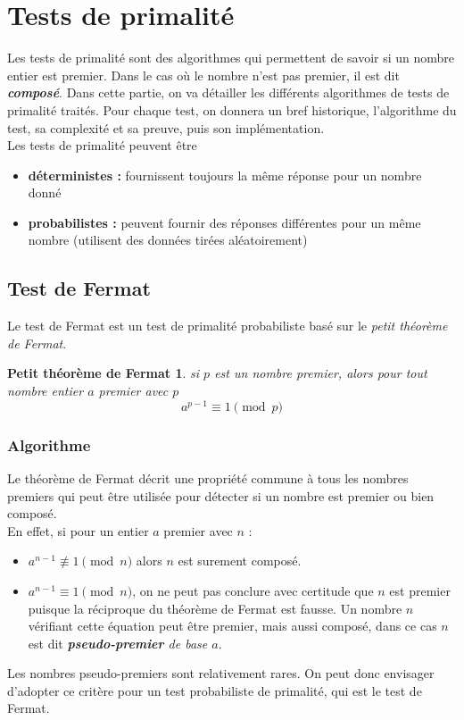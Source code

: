 	\section{Tests de primalité}
		Les tests de primalité sont des algorithmes qui permettent de savoir si un nombre entier est premier. Dans le cas où le nombre n'est pas premier, il est dit \textbf{\textit{composé}}. Dans cette partie, on va détailler les différents algorithmes de tests de primalité traités. Pour chaque test, on donnera un bref historique, l'algorithme du test, sa complexité et sa preuve, puis son implémentation.\\
		Les tests de primalité peuvent être
		\begin{itemize}[leftmargin=*]
			\item \textbf{déterministes :} fournissent toujours la même réponse pour un nombre donné
			\item \textbf{probabilistes :} peuvent fournir des réponses différentes pour un même nombre (utilisent des données tirées aléatoirement)
		\end{itemize}
		
		\subsection{Test de Fermat}
			Le test de Fermat est un test de primalité probabiliste basé sur le \textit{petit théorème de Fermat}.
			\newtheorem*{Fermat}{Petit théorème de Fermat}
			\vspace{-1.5em}\begin{adjustwidth}{1.5cm}{1.5cm} 
			\begin{Fermat}
				si $p$ est un nombre premier, alors pour tout nombre entier $a$ premier avec $p$
				\[a^{p-1}\equiv 1 \pmod p\]
			\end{Fermat}
			\end{adjustwidth}\vspace{0.5em}
			
			\subsubsection{Algorithme}
				Le théorème de Fermat décrit une propriété commune à tous les nombres premiers qui peut être utilisée pour détecter si un nombre est premier ou bien composé.\\
				En effet, si pour un entier $a$ premier avec $n$ : 
				\begin{itemize}
				\item $a^{n-1} \not\equiv 1 \pmod n$ alors $n$ est surement composé.
				\item $a^{n-1}\equiv 1 \pmod n$, on ne peut pas conclure avec certitude que $n$ est premier puisque la réciproque du théorème de Fermat est fausse. Un nombre $n$ vérifiant cette équation peut être premier, mais aussi composé, dans ce cas $n$ est dit \textit{\textbf{pseudo-premier} de base $a$}.
				\end{itemize}
				Les nombres pseudo-premiers sont relativement rares. On peut donc envisager d'adopter ce critère pour un test probabiliste de primalité, qui est le test de Fermat.
				
